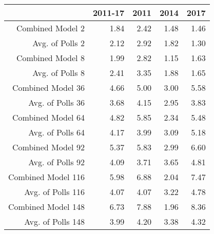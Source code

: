 \begin{table}[ht]
\centering
\begin{tabular}{rrrrr}
  \hline
 & 2011-17 & 2011 & 2014 & 2017 \\ 
  \hline
Combined Model 2 & 1.84 & 2.42 & 1.48 & 1.46 \\ 
  Avg. of Polls 2 & 2.12 & 2.92 & 1.82 & 1.30 \\ 
  Combined Model 8 & 1.99 & 2.82 & 1.15 & 1.63 \\ 
  Avg. of Polls 8 & 2.41 & 3.35 & 1.88 & 1.65 \\ 
  Combined Model 36 & 4.66 & 5.00 & 3.00 & 5.58 \\ 
  Avg. of Polls 36 & 3.68 & 4.15 & 2.95 & 3.83 \\ 
  Combined Model 64 & 4.82 & 5.85 & 2.34 & 5.48 \\ 
  Avg. of Polls 64 & 4.17 & 3.99 & 3.09 & 5.18 \\ 
  Combined Model 92 & 5.37 & 5.83 & 2.99 & 6.60 \\ 
  Avg. of Polls 92 & 4.09 & 3.71 & 3.65 & 4.81 \\ 
  Combined Model 116 & 5.98 & 6.88 & 2.04 & 7.47 \\ 
  Avg. of Polls 116 & 4.07 & 4.07 & 3.22 & 4.78 \\ 
  Combined Model 148 & 6.73 & 7.88 & 1.96 & 8.36 \\ 
  Avg. of Polls 148 & 3.99 & 4.20 & 3.38 & 4.32 \\ 
   \hline
\end{tabular}
\end{table}
